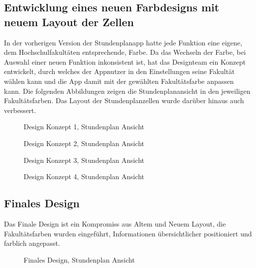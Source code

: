 \subsection{Entwicklung eines neuen Farbdesigns mit neuem Layout der Zellen}
In der vorherigen Version der Stundenplanapp hatte jede Funktion eine eigene, dem Hochschulfakultäten entsprechende, Farbe. Da das Wechseln der Farbe, bei Auswahl einer neuen Funktion inkonsistent ist, hat das Designteam ein Konzept entwickelt, durch welches der Appnutzer in den Einstellungen seine Fakultät wählen kann und die App damit mit der gewählten Fakultätsfarbe anpassen kann. 
Die folgenden Abbildungen zeigen die Stundenplanansicht in den jeweiligen Fakultätsfarben. Das Layout der Stundenplanzellen wurde darüber hinaus auch verbessert. 

\begin{figure}[H]
	\centering
	\caption{Design Konzept 1, Stundenplan Ansicht}
	\label{fig1}
\end{figure}

\begin{figure}[H]
	\centering
	\caption{Design  Konzept 2, Stundenplan Ansicht}
	\label{fig1}
\end{figure}

\begin{figure}[H]
	\centering
	\caption{Design Konzept 3,  Stundenplan Ansicht}
	\label{fig1}
\end{figure}

\begin{figure}[H]
	\centering
	\caption{Design Konzept 4,  Stundenplan Ansicht}
	\label{fig1}
\end{figure}

\subsection{Finales Design}
Das Finale Design ist ein Kompromiss aus Altem und Neuem Layout, die Fakultätsfarben wurden eingeführt, Informationen übersichtlicher positioniert und farblich angepasst.

\begin{figure}[H]
	\centering
	\caption{Finales Design, Stundenplan Ansicht}
	\label{fig1}
\end{figure}

